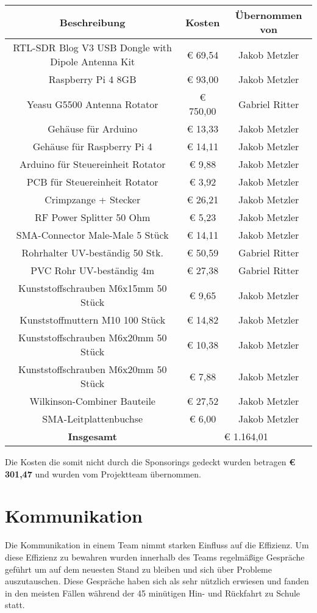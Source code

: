 \begin{tabular}{|c|c|c|}
	\hline
	\textbf{Beschreibung} & \textbf{Kosten} & \textbf{Übernommen von} \\
	\hline
	RTL-SDR Blog V3 USB Dongle with Dipole Antenna Kit &  € 69,54  & Jakob Metzler \\
	\hline
	Raspberry Pi 4 8GB &  € 93,00  & Jakob Metzler \\
	\hline
	Yeasu G5500 Antenna Rotator &  € 750,00  & Gabriel Ritter \\
	\hline
	Gehäuse für Arduino &  € 13,33  & Jakob Metzler \\
	\hline
	Gehäuse für Raspberry Pi 4 &  € 14,11  & Jakob Metzler \\
	\hline
	Arduino für Steuereinheit Rotator &  € 9,88  & Jakob Metzler \\
	\hline
	PCB für Steuereinheit Rotator &  € 3,92  & Jakob Metzler \\
	\hline
	Crimpzange + Stecker &  € 26,21  & Jakob Metzler \\
	\hline
	RF Power Splitter 50 Ohm &  € 5,23  & Jakob Metzler \\
	\hline
	SMA-Connector Male-Male 5 Stück &  € 14,11  & Jakob Metzler \\
	\hline
	Rohrhalter UV-beständig 50 Stk. &  € 50,59  & Gabriel Ritter \\
	\hline
	PVC Rohr UV-beständig 4m &  € 27,38  & Gabriel Ritter \\
	\hline
	Kunststoffschrauben M6x15mm 50 Stück &  € 9,65  & Jakob Metzler \\
	\hline
	Kunststoffmuttern M10 100 Stück &  € 14,82  & Jakob Metzler \\
	\hline
	Kunststoffschrauben M6x20mm 50 Stück &  € 10,38  & Jakob Metzler \\
	\hline
	Kunststoffschrauben M6x20mm 50 Stück &  € 7,88  & Jakob Metzler \\
	\hline
	Wilkinson-Combiner Bauteile &  € 27,52  & Jakob Metzler \\
	\hline
	SMA-Leitplattenbuchse &  € 6,00  & Jakob Metzler \\
	\hhline{|===|}
	\textbf{Insgesamt} & \multicolumn{2}{c|}{€ 1.164,01} \\
	\hline
\end{tabular}

Die Kosten die somit nicht durch die Sponsorings gedeckt wurden betragen \textbf{€ 301,47} und wurden vom Projektteam übernommen. 

\section{Kommunikation}
Die Kommunikation in einem Team nimmt starken Einfluss auf die Effizienz. Um diese Effizienz zu bewahren wurden innerhalb des Teams regelmäßige Gespräche geführt um auf dem neuesten Stand zu bleiben und sich über Probleme auszutauschen. Diese Gespräche haben sich als sehr nützlich erwiesen und fanden in den meisten Fällen während der 45 minütigen Hin- und Rückfahrt zu Schule statt. 